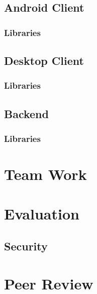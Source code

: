 \documentclass[11pt,a4paper]{report}
\begin{document}
\section{Android Client}

\subsection{Libraries}

\section{Desktop Client}

\subsection{Libraries}

\section{Backend}

\subsection{Libraries}

\chapter{Team Work}

\chapter{Evaluation}


\section{Security}


\chapter{Peer Review}

\begin{thebibliography}{9}

\end{thebibliography}
\end{document}
